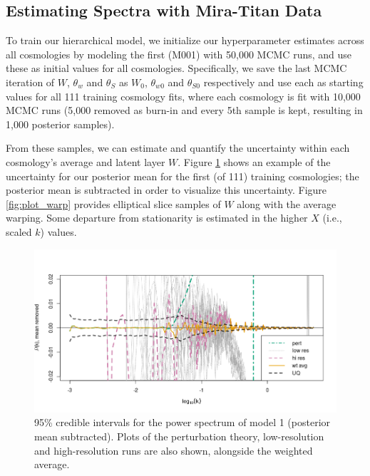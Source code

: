 \documentclass[11pt]{article}
\begin{document}
\subsection{Estimating Spectra with Mira-Titan Data}
\label{subsec:mira_fit}

To train our hierarchical model, we initialize our hyperparameter estimates across all cosmologies by modeling the first (M001) with 50,000 MCMC runs, and use these as initial values for all cosmologies. Specifically, we save the last MCMC iteration of $W$, $\theta_w$ and $\theta_S$ as $W_0$, $\theta_{w0}$ and $\theta_{S0}$ respectively and use each as starting values for all 111 training cosmology fits, where each cosmology is fit with 10,000 MCMC runs (5,000 removed as burn-in and every 5th sample is kept, resulting in 1,000 posterior samples).

From these samples, we can estimate and quantify the uncertainty within each cosmology's average and latent layer $W$. Figure \ref{fig:plot_fit} shows an example of the uncertainty for our posterior mean for the first (of 111) training cosmologies; the posterior mean is subtracted in order to visualize this uncertainty. Figure \ref{fig:plot_warp} provides elliptical slice samples of $W$ along with the average warping. Some departure from stationarity is estimated in the higher $X$ (i.e., scaled $k$) values.

\begin{figure}[ht]
    \centering
    \includegraphics[width=6in]{plot_fit.png}
    \caption{95\% credible intervals for the power spectrum of model 1 (posterior mean subtracted). Plots of the perturbation theory, low-resolution and high-resolution runs are also shown, alongside the weighted average.}
    \label{fig:plot_fit}
\end{figure}
\end{document}
